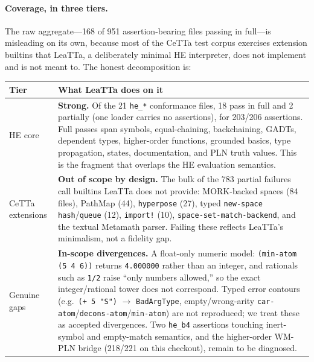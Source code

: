 \documentclass[11pt]{article}
\newcommand{\code}[1]{\texttt{#1}}
\newcommand{\HE}{\textup{HE}}
\newcommand{\CeTTa}{\textup{CeTTa}}
\newcommand{\LeaTTa}{\textup{LeaTTa}}
\newcommand{\PathMap}{\textup{PathMap}}
\begin{document}
\paragraph{Coverage, in three tiers.}
The raw aggregate---168 of 951 assertion-bearing files passing in
full---is misleading on its own, because most of the \CeTTa{} test
corpus exercises extension builtins that \LeaTTa{}, a deliberately
minimal \HE{} interpreter, does not implement and is not meant to.  The
honest decomposition is:

\begin{center}
\small
\begin{tabular}{p{3.3cm}p{11.3cm}}
\toprule
Tier & What \LeaTTa{} does on it \\
\midrule
\HE{} core & \textbf{Strong.}  Of the 21 \code{he\_*} conformance files,
18 pass in full and 2 partially (one loader carries no assertions),
for 203/206 assertions.  Full passes span symbols, equal-chaining,
backchaining, GADTs, dependent types, higher-order functions, grounded
basics, type propagation, states, documentation, and PLN truth values.
This is the fragment that overlaps the \HE{} evaluation semantics. \\
\addlinespace
\CeTTa{} extensions & \textbf{Out of scope by design.}  The bulk of the
783 partial failures call builtins \LeaTTa{} does not provide:
MORK-backed spaces (84 files), \PathMap{} (44), \code{hyperpose} (27),
typed \code{new-space hash}/\code{queue} (12), \code{import!} (10),
\code{space-set-match-backend}, and the textual Metamath parser.
Failing these reflects \LeaTTa{}'s minimalism, not a fidelity gap. \\
\addlinespace
Genuine gaps & \textbf{In-scope divergences.}  A float-only numeric
model: \code{(min-atom (5 4 6))} returns \code{4.000000} rather than an
integer, and rationals such as \code{1/2} raise ``only numbers
allowed,'' so the exact integer/rational tower does not correspond.
Typed error contours (e.g.\ \code{(+ 5 "S")} $\to$ \code{BadArgType},
empty/wrong-arity \code{car-atom}/\code{decons-atom}/\code{min-atom})
are not reproduced; we treat these as accepted divergences.  Two
\code{he\_b4} assertions touching inert-symbol and empty-match
semantics, and the higher-order WM-PLN bridge (218/221 on this
checkout), remain to be diagnosed. \\
\bottomrule
\end{tabular}
\normalsize
\end{center}
\end{document}
